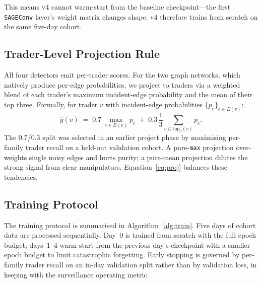 \documentclass[10pt,twocolumn,letterpaper]{article}
\begin{document}
This means v4 cannot warm-start from the baseline checkpoint---the
first \texttt{SAGEConv} layer's weight matrix changes shape. v4
therefore trains from scratch on the same five-day cohort.


\subsection{Trader-Level Projection Rule}
\label{sec:proj}
All four detectors emit per-trader scores. For the two graph networks,
which natively produce per-edge probabilities, we project to traders
via a weighted blend of each trader's maximum incident-edge probability
and the mean of their top three. Formally, for trader \(v\) with
incident-edge probabilities \(\{p_e\}_{e\in E(v)}\):
\begin{equation}
\hat{y}(v) \;=\; 0.7\,\max_{e\in E(v)} p_e \;+\; 0.3\,
\frac{1}{3}\!\!\sum_{e\in\mathrm{top}_3(v)}\!\! p_e .
\label{eq:proj}
\end{equation}
The \(0.7\)/\(0.3\) split was selected in an earlier project phase by
maximising per-family trader recall on a held-out validation cohort.
A pure-\texttt{max} projection over-weights single noisy edges and
hurts purity; a pure-mean projection dilutes the strong signal from
clear manipulators. Equation~\eqref{eq:proj} balances these tendencies.

\subsection{Training Protocol}
\label{sec:training}
The training protocol is summarised in Algorithm~\ref{alg:train}.
Five days of cohort data are processed sequentially. Day~0 is trained
from scratch with the full epoch budget; days~1--4 warm-start from the
previous day's checkpoint with a smaller epoch budget to limit
catastrophic forgetting. Early stopping is governed by per-family
trader recall on an in-day validation split rather than by validation
loss, in keeping with the surveillance operating metric.
\end{document}
